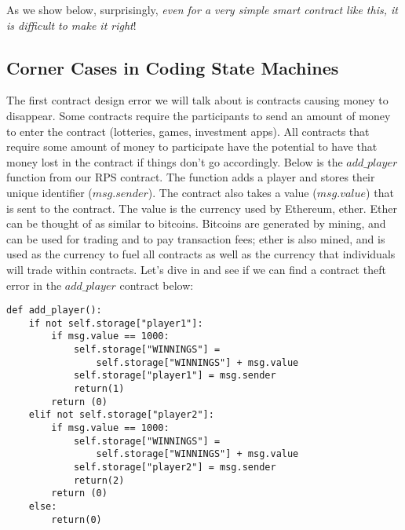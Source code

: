 \documentclass[10pt,twocolumn,letterpaper]{article}
\newcommand{\elaine}[1]{{\color{red}{[elaine: #1]}}}
\newcommand{\ignore}[1]{}
\begin{document}
As we show below, 
surprisingly, {\it even for a very simple smart contract like this, 
it is difficult 
to make it right}!

\elaine{emphasize this in the intro too.}


\ignore{
In this section, we'll explore the security and incentive alignment pitfalls in designing a smart contract. We'll use an easy-to-understand application as a running example, based on a Rock-Paper-Scissors game. We then analyze a plausible (but subtly buggy) initial implementation, pointing out its flaws. Mistakes resembling these were actually observed in our Smart Contract Programming Lab in ``CMSC 414 - Undergraduate Security''. vThis section is centered around the exercises. We provide hints to guide the reader towards discovering how to improve on them. Our ``reference'' solution can be found in the accompanying materials.
}


\subsection{Corner Cases in Coding State Machines}
The first contract design error we will talk about is contracts causing money to disappear. Some contracts require the participants to send an amount of money to enter the contract (lotteries, games, investment apps). All contracts that require some amount of money to participate have the potential to have that money lost in the contract if things don't go accordingly. Below is the $add\_player$ function from our RPS contract. The function adds a player and stores their unique identifier ($msg.sender$). The contract also takes a value ($msg.value$) that is sent to the contract. The value is the currency used by Ethereum, ether. Ether can be thought of as similar to bitcoins. Bitcoins are generated by mining, and can be used for trading and to pay transaction fees; ether is also mined, and is used as the currency to fuel all contracts as well as the currency that individuals will trade within contracts. Let's dive in and see if we can find a contract theft error in the $add\_player$ contract below: 

\begin{mdframed}
\begin{verbatim}
def add_player():
	if not self.storage["player1"]:
		if msg.value == 1000:
			self.storage["WINNINGS"] = 
				self.storage["WINNINGS"] + msg.value
			self.storage["player1"] = msg.sender
			return(1)
		return (0)
	elif not self.storage["player2"]:
		if msg.value == 1000:
			self.storage["WINNINGS"] = 
				self.storage["WINNINGS"] + msg.value
			self.storage["player2"] = msg.sender
			return(2)
		return (0)
	else:
		return(0)
\end{verbatim}
\end{mdframed}
\end{document}
